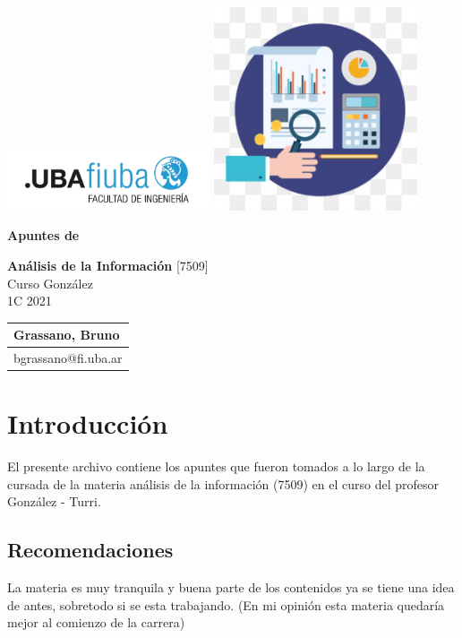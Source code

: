 \documentclass[titlepage,a4paper]{article}
\begin{document}
\begin{titlepage} %
	\hfill\includegraphics[width=6cm]{logofiuba.jpg}
    \centering
    \vfill
    \includegraphics[width=6cm]{Imagenes/logo.jpg}
    
    \Huge \textbf{Apuntes de}
    
    \Huge \textbf{Análisis de la Información}
    \vskip2cm
    \Large [7509]\\
    Curso González \\
    1C 2021 
    \vfill
    \begin{tabular}{ | l | }
      \hline
      Grassano, Bruno \\ \hline
      bgrassano@fi.uba.ar \\ \hline
  	\end{tabular}
    \vfill
    \vfill
\end{titlepage}

\tableofcontents %

\newpage

\section{Introducción}\label{sec:intro}
El presente archivo contiene los apuntes que fueron tomados a lo largo de la cursada de la materia análisis de la información (7509) en el curso del profesor González - Turri.

\subsection*{Recomendaciones}
La materia es muy tranquila y buena parte de los contenidos ya se tiene una idea de antes, sobretodo si se esta trabajando. (En mi opinión esta materia quedaría mejor al comienzo de la carrera)
\end{document}
